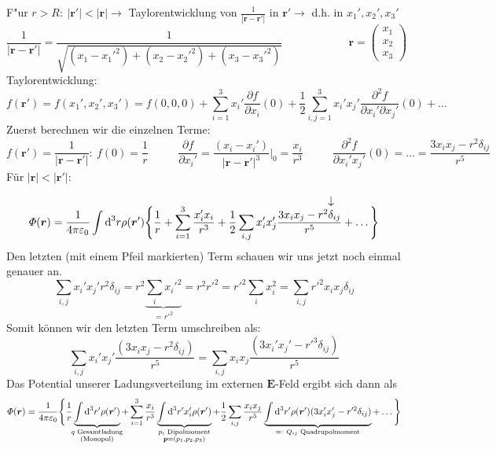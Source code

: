 \documentclass[titlepage,11pt,a4paper,ngerman]{report}
\newcommand*{\eqdef}{=\mathrel{\vcenter{\baselineskip0.5ex \lineskiplimit0pt \hbox{\scriptsize.}\hbox{\scriptsize.}}}}
\newcommand{\tx}[1]{\textrm{#1}}
\newcommand{\dd}{\tx{d}}
\newcommand{\custoup}[3]{\overset{\scriptstyle\underset{\mkern4mu\rotatebox{-90}{$\hspace{-3pt} #1$}}{#3}}{#2}}
\renewcommand{\Phi}{\varPhi}
\renewcommand{\vec}[1]{\boldsymbol{#1}}
\renewcommand{\epsilon}{\varepsilon}
\begin{document}
F"ur $r>R:\ |\vec{r}'|<|\vec{r}|\rightarrow$ Taylorentwicklung von $\frac{1}{|\vec{r}-\vec{r}'|}$ in $\vec{r'} \rightarrow$ d.h. in $ x_1',x_2',x_3'$ \\
\[\frac{1}{|\vec{r}-\vec{r}'|}=\frac{1}{\sqrt{(x_1-x_1'^2)+(x_2-x_2'^2)+(x_3-x_3'^2)}} \qquad \qquad \qquad \vec{r}=\begin{pmatrix}x_1\\x_2\\x_3\end{pmatrix}\]
Taylorentwicklung:
\[f(\vec{r}')=f(x_1',x_2',x_3')=f(0,0,0)+\sum_{i=1}^3x_i'\frac{\partial f}{\partial x_i}(0)+\frac{1}{2}\sum_{i,j=1}^3x_i'x_j'\frac{\partial^2f}{\partial x_i'\partial x_j'}(0)+\ldots\]
Zuerst berechnen wir die einzelnen Terme:
\[f(\vec{r}')=\frac{1}{|\vec{r}-\vec{r}'|}:\ f(0)=\frac{1}{r} \qquad \ \ \  \frac{\partial f}{\partial x_i'}=\frac{(x_i-x_i')}{|\vec{r}-\vec{r}'|^3}\bigg|_0=\frac{x_i}{r^3} \qquad \ \ \ \frac{\partial^2f}{\partial x_i'x_j'}(0)=\ldots=\frac{3x_ix_j-r^2 \delta_{ij}}{r^5}\]
Für $|\vec{r}|<|\vec{r}'|$:
\vspace{-15pt} \[\Phi(\vec{r})=\frac{1}{4\pi\epsilon_0}\int\dd^3r\rho(\vec{r}')\Bigg\{\frac{1}{r}+\sum_{i=1}^3\frac{x_i'x_i}{r^3}+\frac{1}{2}\sum_{i,j}x_i'x_j'\frac{3x_ix_j-\custoup{\rightarrow}{r^2\delta_{ij}}{}}{r^5}+\ldots\Bigg\}\]
Den letzten (mit einem Pfeil markierten) Term schauen wir uns jetzt noch einmal genauer an.
\[\sum_{i,j}x_i'x_j'r^2\delta_{ij}=r^2\underbrace{\sum_ix_i'^2}_{=r'^2}=r^2r'^2=r'^2\sum_ix_i^2=\sum_{i,j}r'^2x_ix_j\delta_{ij}\]
Somit können wir den letzten Term umschreiben als:
\[\sum_{i,j}x_i'x_j'\frac{(3x_ix_j-r^2\delta_{ij})}{r^5}=\sum_{i,j}x_ix_j\frac{(3x_i'x_j'-r'^3\delta_{ij})}{r^5}\]
Das Potential unserer Ladungsverteilung im externen $ \vec{E} $-Feld ergibt sich dann als
\begingroup\makeatletter\def\f@size{10}\check@mathfonts
\def\maketag@@@#1{\hbox{\m@th\large\normalfont#1}}
\begin{equation*}
\Phi(\vec{r})=\frac{1}{4\pi\epsilon_0}\Bigg\{\frac{1}{r} \underbrace{\int\dd^3r'\rho(\vec{r}')}_{\mathclap{\substack{ q \textrm{ Gesamtladung} \\  \tx{(Monopol)}}}} +\sum_{i=1}^3\frac{x_i}{r^3} \underbrace{\int\dd^3r'x_i'\rho(\vec{r}')}_{\mathclap{\substack{p_i \textrm{ Dipolmoment} \\ \vec{p}=(p_1,p_2,p_3)}}}  +\frac{1}{2}\sum_{i,j}\frac{x_ix_j}{r^5}\underbrace{\int\dd^3r'\rho(\vec{r}')(3x_i'x_j'-r'^2\delta_{ij})}_{\mathclap{\eqdef\ Q_{ij}\textrm{ Quadrupolmoment}}}+\ldots\Bigg\}
\end{equation*}\endgroup
\end{document}
